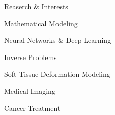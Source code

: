 \begin{rSection}{Reaserch \& Interests}	
	\begin{rSubsection}{}{}{}{}
		\item Mathematical Modeling
		\item Neural-Networks \& Deep Learning
		\item Inverse Problems
		\item Soft Tissue Deformation Modeling
		\item Medical Imaging
		\item Cancer Treatment	
	\end{rSubsection}
\end{rSection}

